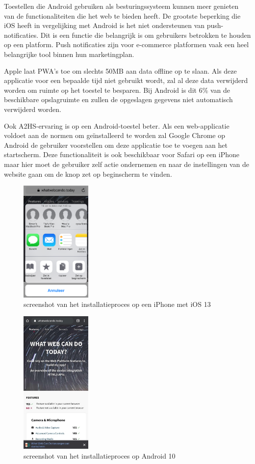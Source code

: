 		Toestellen die Android gebruiken als besturingssysteem kunnen meer genieten van de functionaliteiten die het web te bieden heeft.
		De grootste beperking die iOS heeft in vergelijking met Android is het niet ondersteunen van push-notificaties. Dit is een functie die belangrijk is om gebruikers betrokken te houden op een platform. Push notificaties zijn voor e-commerce platformen vaak een heel belangrijke tool binnen hun marketingplan.
		\autocite{Anastasia2017}
		
		Apple laat PWA's toe om slechts 50MB aan data offline op te slaan. Als deze applicatie voor een bepaalde tijd niet gebruikt wordt, zal al deze data verwijderd worden om ruimte op het toestel te besparen. Bij Android is dit 6\% van de beschikbare opslagruimte en zullen de opgeslagen gegevens niet automatisch verwijderd worden.
		
		Ook A2HS-ervaring is op een Android-toestel beter. Als een web-applicatie voldoet aan de normen om geïnstalleerd te worden zal Google Chrome op Android de gebruiker voorstellen om deze applicatie toe te voegen aan het startscherm. Deze functionaliteit is ook beschikbaar voor Safari op een iPhone maar hier moet de gebruiker zelf actie ondernemen en naar de instellingen van de website gaan om de knop zet op beginscherm te vinden.
		
		\begin{figure}[H]
			\centering
			\includegraphics[width=35mm]{./img/installation_iOS.png}
			\caption{screenshot van het installatieproces op een iPhone met iOS 13}
		\end{figure}
		
		\begin{figure}[H]
			\centering
			\includegraphics[width=35mm]{./img/installation_android.png}
			\caption{screenshot van het installatieproces op Android 10}
		\end{figure}
	
